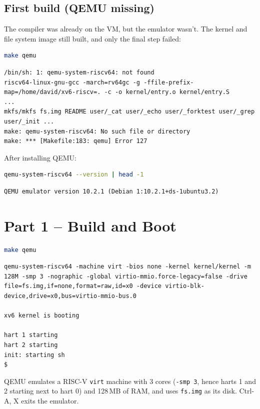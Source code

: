 \documentclass[12pt]{article}
\begin{document}
\subsection*{First build (QEMU missing)}
The compiler was already on the VM, but the emulator wasn't. The kernel and file system image still built, and only the final step failed:
\begin{lstlisting}[language=bash]
make qemu
\end{lstlisting}
\begin{lstlisting}
/bin/sh: 1: qemu-system-riscv64: not found
riscv64-linux-gnu-gcc -march=rv64gc -g -ffile-prefix-map=/home/david/xv6-riscv=. -c -o kernel/entry.o kernel/entry.S
...
mkfs/mkfs fs.img README user/_cat user/_echo user/_forktest user/_grep user/_init ...
make: qemu-system-riscv64: No such file or directory
make: *** [Makefile:183: qemu] Error 127
\end{lstlisting}

After installing QEMU:
\begin{lstlisting}[language=bash]
qemu-system-riscv64 --version | head -1
\end{lstlisting}
\begin{lstlisting}
QEMU emulator version 10.2.1 (Debian 1:10.2.1+ds-1ubuntu3.2)
\end{lstlisting}

\section*{Part 1 -- Build and Boot}
\begin{lstlisting}[language=bash]
make qemu
\end{lstlisting}
\begin{lstlisting}
qemu-system-riscv64 -machine virt -bios none -kernel kernel/kernel -m 128M -smp 3 -nographic -global virtio-mmio.force-legacy=false -drive file=fs.img,if=none,format=raw,id=x0 -device virtio-blk-device,drive=x0,bus=virtio-mmio-bus.0

xv6 kernel is booting

hart 1 starting
hart 2 starting
init: starting sh
$ 
\end{lstlisting}
QEMU emulates a RISC-V \texttt{virt} machine with 3 cores (\texttt{-smp 3}, hence harts 1 and 2 starting next to hart 0) and 128\,MB of RAM, and uses \texttt{fs.img} as its disk. Ctrl-A, X exits the emulator.
\end{document}
